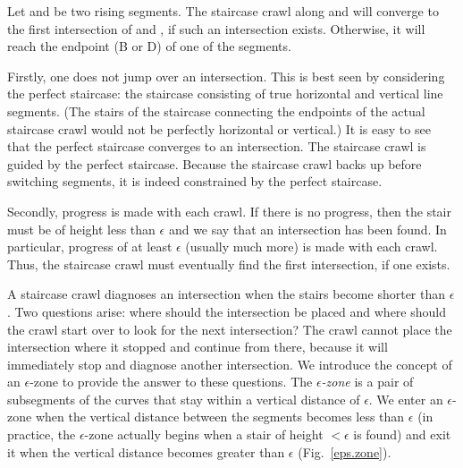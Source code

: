 \begin{lemma}
\label{lem-converge}
Let  and  be two rising segments.
The staircase crawl along  and  will converge
to the first intersection of  and , if such an 
intersection exists.
Otherwise, it will reach the endpoint (B or D) of one of the segments.
\end{lemma}
Firstly, one does not jump over an intersection.
This is best seen by considering the perfect staircase: the staircase consisting of true
horizontal and vertical line segments. %
(The stairs of the staircase connecting the endpoints of the actual staircase crawl would not be
perfectly horizontal or vertical.)
It is easy to see that the perfect staircase converges to an intersection.
The staircase crawl is guided by the perfect staircase.
Because the staircase crawl backs up before switching segments, it is indeed constrained by 
the perfect staircase.

Secondly, progress is made with each crawl. 
If there is no progress, then the stair must
be of height less than $\epsilon$ and we say that an intersection has been found.
In particular, progress of at least $\epsilon$ (usually much more) is made with each crawl.
Thus, the staircase crawl must eventually find the first intersection, if one exists.
\QED

A staircase crawl diagnoses an intersection when the stairs become shorter than $\epsilon$.
Two questions arise: where should the intersection be placed  and
where should the crawl start over to look for the next intersection?
The crawl cannot place the intersection where it stopped and continue
from there, because it will immediately stop and diagnose another intersection.
We introduce the concept of an $\epsilon$-zone to provide the answer to these questions.
The {\em $\epsilon$-zone} is a pair of subsegments of the curves that stay within a 
vertical distance of $\epsilon$.
We enter an $\epsilon$-zone when the vertical distance between the segments becomes
less than $\epsilon$ (in practice, the $\epsilon$-zone actually begins when a 
	stair of height $< \epsilon$ is found)
and exit it when the vertical distance becomes greater than $\epsilon$
(Fig.~\ref{eps.zone}).


